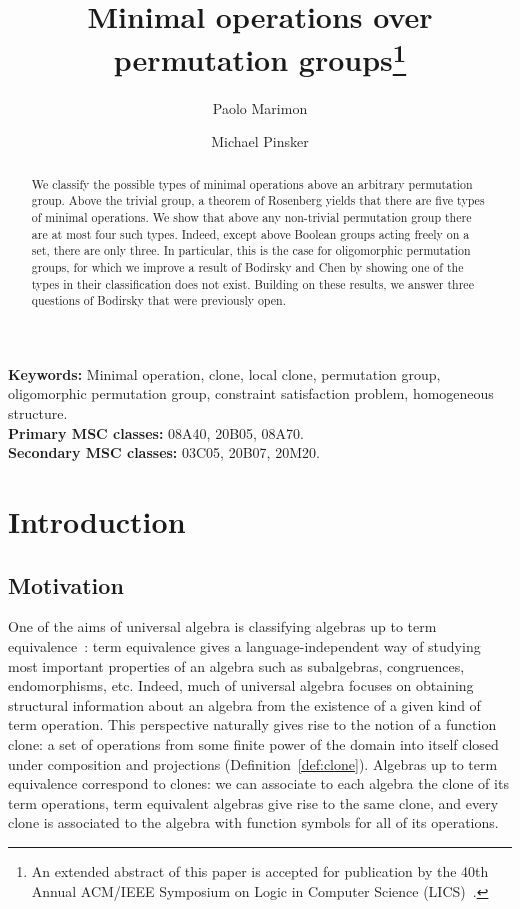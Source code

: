 \documentclass{article}
\title{Minimal operations over permutation groups\footnote{An extended abstract of this paper is accepted for publication by the 40th Annual ACM/IEEE Symposium on Logic in Computer Science
(LICS)~\cite{Binarysymm}.}}
\author[1]{Paolo Marimon}
\author[2]{Michael Pinsker}
\affil[1]{Institut f\"{u}r Diskrete Mathematik \& Geometrie, TU Wien. Vienna, Austria.}
\affil[2]{Institut f\"{u}r Diskrete Mathematik \& Geometrie, TU Wien. Vienna, Austria.}
\theoremstyle{remark}
\theoremstyle{definition}
\begin{document}
\maketitle
\begin{abstract} 
We classify the possible types of minimal operations above an arbitrary permutation group. Above the trivial group, a theorem of Rosenberg yields that there are five types of minimal operations. We show that above any non-trivial permutation group there are at most four such types. Indeed, except above Boolean groups acting freely on a set, there are only three. In particular, this is the case for oligomorphic permutation groups, for which we improve a result of Bodirsky and Chen by showing one of the types in their classification does not exist. Building on these results, we answer three questions of Bodirsky that were previously open.
\end{abstract}
\textbf{Keywords:} Minimal operation, clone, local clone, permutation group, oligomorphic permutation group,   constraint satisfaction problem,  homogeneous structure.\\ 
\textbf{Primary MSC classes:} 08A40, 20B05, 08A70.\\
\textbf{Secondary MSC classes:} 03C05, 20B07, 20M20.

\tableofcontents

\section{Introduction}
\subsection{Motivation}\label{subsect:motivation}

One of the aims of universal algebra is  classifying algebras up to term equivalence~\cite{szendrei1986clones}: term equivalence gives a language-independent way of studying most important properties of an algebra such as subalgebras, congruences, endomorphisms, etc. Indeed, much of universal algebra focuses on obtaining structural information about an algebra from the existence of a given kind of term operation. This perspective naturally gives rise to the notion of a function clone: a set of operations from some finite power of the domain into itself closed under composition and projections (Definition~\ref{def:clone}). Algebras up to term equivalence correspond to clones: we can associate to each algebra the clone of its term operations, term equivalent algebras give rise to the same clone, and every clone is associated to the algebra with function symbols for all of its operations.\\
\end{document}
